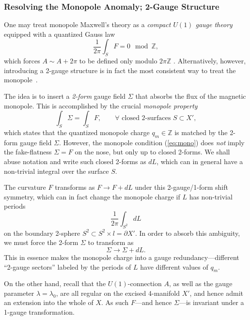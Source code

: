 \documentclass[onecolumn]{article}
\theoremstyle{theorem}
\theoremstyle{remark}
\theoremstyle{example}
\theoremstyle{definition}
\numberwithin{equation}{section}
\def\bbZ{\mathbb{Z}}
\begin{document}
\subsubsection{Resolving the Monopole Anomaly; 2-Gauge Structure} 
One may treat monopole Maxwell's theory as a {\it {compact $U(1)$ gauge theory}} equipped with a quantized Gauss law $$\frac{1}{2\pi}\int_S F = 0 \mod\bbZ,$$ which forces $A \sim A +2\pi$ to be defined only modulo $2\pi\bbZ$ \cite{Kogan:1995}. Alternatively, however, introducing a 2-gauge structure is in fact the most consistent way to treat the monopole~\cite{Cordova:2018cvg,Benini_2019}.

The idea is to insert a {\it {2-form}} gauge field $\Sigma$ that absorbs the flux of the magnetic monopole. This is accomplished by the crucial {\it {monopole property}}
\begin{equation}
    \int_S \Sigma = \int_S F,\qquad \forall\text{ closed 2-surfaces }S\subset X',\label{eq:mono}
\end{equation}
which states that the quantized monopole charge ${q}_m\in\bbZ$ is matched by the 2-form gauge field $\Sigma$. However, the monopole condition  (\ref{eq:mono}) does {\it not} imply the fake-flatness $\Sigma = F$ on the nose, but only up to closed 2-forms. We shall abuse notation and write such closed 2-forms as $dL$, which can in general have a non-trivial integral over the surface $S$. 

The curvature $F$ transforms as $F\rightarrow F + dL$ under this 2-gauge/1-form shift symmetry, which can in fact change the monopole charge if $L$ has non-trivial periods
\begin{equation}
    \frac{1}{2\pi}\int_{S^2} dL\nonumber
\end{equation}
on the boundary 2-sphere $S^2\subset S^2\times l =\partial X'$. In order to absorb this ambiguity, we must force the 2-form $\Sigma$ to transform as
\begin{equation}
    \Sigma \rightarrow \Sigma + dL.\label{eq:ab2gau}
\end{equation}
{This} in essence makes the monopole charge into a gauge redundancy---different ``2-gauge sectors'' labeled by the periods of $L$ have different values of $q_m$.

On the other hand, recall that the $U(1)$-connection $A$, as well as the gauge parameter $\lambda=\lambda_0$, are all regular on the excised 4-manifold $X'$, and hence admit an extension into the whole of $X$. As such $F$---and hence $\Sigma$---is invariant under a 1-gauge transformation.
\end{document}
